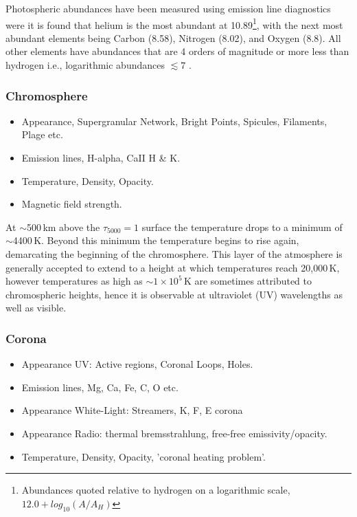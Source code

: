 Photospheric abundances have been measured using emission line diagnostics were it is found that helium is the most abundant at 10.89\footnote{Abundances quoted relative to hydrogen on a logarithmic scale, $12.0+log_{10}(A/A_H)$}, with the next most abundant elements being Carbon (8.58), Nitrogen (8.02), and Oxygen (8.8). All other elements have abundances that are 4 orders of magnitude or more less than hydrogen i.e., logarithmic abundances $\lesssim7$ \citep{phillips2008}.

\subsubsection{Chromosphere}\label{sec:122}

\begin{itemize}
\item Appearance, Supergranular Network, Bright Points, Spicules, Filaments, Plage etc.
\item Emission lines, H-alpha, CaII H \& K. 
\item Temperature, Density, Opacity.
\item Magnetic field strength.
\end{itemize}

At $\sim$500\,km above the $\tau_{5000}=1$ surface the temperature drops to a minimum of $\sim$4400\,K. Beyond this minimum the temperature begins to rise again, demarcating the beginning of the chromosphere. This layer of the atmosphere is generally accepted to extend to a height at which temperatures reach 20,000\,K, however temperatures as high as $\sim1\times10^5$\,K are sometimes attributed to chromospheric heights, hence it is observable at ultraviolet (UV) wavelengths as well as visible. 

\subsubsection{Corona}\label{sec:123}

\begin{itemize}
\item Appearance UV: Active regions, Coronal Loops, Holes.
\item Emission lines, Mg, Ca, Fe, C, O etc.
\item Appearance White-Light: Streamers, K, F, E corona
\item Appearance Radio: thermal bremsstrahlung, free-free emissivity/opacity.
\item Temperature, Density, Opacity, 'coronal heating problem'.
\end{itemize}


